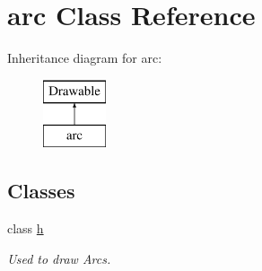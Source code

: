 \hypertarget{classarc}{}\section{arc Class Reference}
\label{classarc}
Inheritance diagram for arc\+:\begin{figure}[H]
\begin{center}
\leavevmode
\includegraphics[height=2.000000cm]{classarc}
\end{center}
\end{figure}
\subsection*{Classes}
\begin{DoxyCompactItemize}
\item 
class \mbox{\hyperlink{classarc_1_1h}{h}}
\begin{DoxyCompactList}\small\item\em Used to draw Arcs. \end{DoxyCompactList}\end{DoxyCompactItemize}
